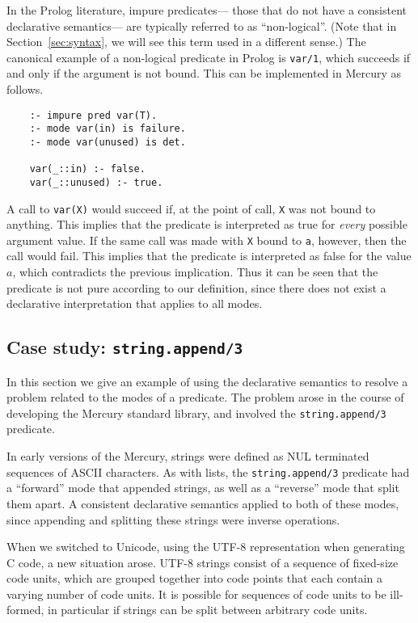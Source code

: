 In the Prolog literature, impure predicates---%
those that do not have a consistent declarative semantics---%
are typically referred to as ``non-logical\label{gi:non-logical}''.
(Note that in Section~\ref{sec:syntax},
we will see this term used in a different sense.)
The canonical example of a non-logical predicate in Prolog
is \texttt{var/1},
which succeeds if and only if the argument is not bound.
This can be implemented in Mercury as follows.
\begin{verbatim}
    :- impure pred var(T).
    :- mode var(in) is failure.
    :- mode var(unused) is det.

    var(_::in) :- false.
    var(_::unused) :- true.
\end{verbatim}
A call to \texttt{var(X)} would succeed if,
at the point of call,
\texttt{X} was not bound to anything.
This implies that the predicate is interpreted as true
for \emph{every} possible argument value.
If the same call was made with \texttt{X} bound to \texttt{a},
however, then the call would fail.
This implies that the predicate is interpreted as false
for the value $a$,
which contradicts the previous implication.
Thus it can be seen that the predicate is not pure
according to our definition,
since there does not exist a declarative interpretation
that applies to all modes.


\subsection{Case study: \texttt{string.append/3}}
\label{sec:purity-example}

In this section we give an example
of using the declarative semantics to resolve a problem
related to the modes of a predicate.
The problem arose in the course of developing the Mercury standard library,
and involved the \texttt{string.append/3} predicate.

In early versions of the Mercury,
strings were defined as NUL terminated sequences of ASCII characters.
As with lists,
the \texttt{string.append/3} predicate had
a ``forward'' mode that appended strings,
as well as a ``reverse'' mode that split them apart.
A consistent declarative semantics applied to both of these modes,
since appending and splitting these strings
were inverse operations.

When we switched to Unicode,
using the UTF-8 representation when generating C code,
a new situation arose.
UTF-8 strings consist of a sequence of fixed-size code units,
which are grouped together into code points
that each contain a varying number of code units.
It is possible for sequences of code units to be ill-formed,
in particular if strings can be split between arbitrary code units.


